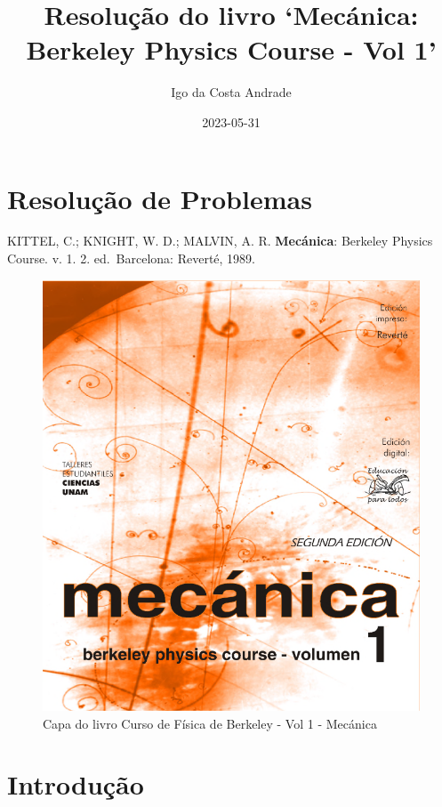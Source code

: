 \documentclass[
]{article}
\title{Resolução do livro `Mecánica: Berkeley Physics Course - Vol 1'}
\author{Igo da Costa Andrade}
\date{2023-05-31}
\begin{document}
\maketitle

{
\setcounter{tocdepth}{2}
\tableofcontents
}
\hypertarget{resoluuxe7uxe3o-de-problemas}{%
\section*{Resolução de Problemas}\label{resoluuxe7uxe3o-de-problemas}}

KITTEL, C.; KNIGHT, W. D.; MALVIN, A. R. \textbf{Mecánica}: Berkeley Physics Course. v. 1. 2. ed.~Barcelona: Reverté, 1989.

\begin{figure}
\centering
\includegraphics{img/berkeley_vol_1_cover.png}
\caption{Capa do livro Curso de Física de Berkeley - Vol 1 - Mecánica}
\end{figure}

\hypertarget{introduuxe7uxe3o}{%
\section{Introdução}\label{introduuxe7uxe3o}}
\end{document}
